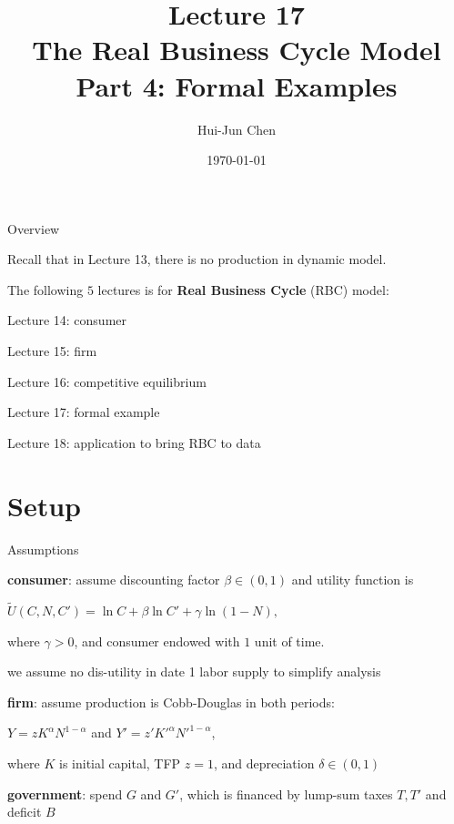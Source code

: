 \documentclass[11pt,aspectratio=169,usenames,dvipsnames]{beamer}
\title[Lecture 17]{Lecture 17 \\ The Real Business Cycle Model \\ Part 4: Formal Examples}
\author[Hui-Jun Chen]{Hui-Jun Chen}
\institute[NTHU]{National Tsing Hua University}
\date{\today}
\let\tempone\itemize
\let\temptwo\enditemize
\renewenvironment{itemize}{\tempone\addtolength{\itemsep}{\fill}}{\temptwo}
\begin{document}
\begin{frame}[plain]
    \titlepage
\end{frame}

\begin{frame}{Overview}
\label{slide:Overview}
    \begin{itemize}
        \item Recall that in Lecture 13, there is no production in dynamic model.
        \item The following $ 5 $ lectures is for \textbf{Real Business Cycle} (RBC) model:
        \begin{itemize}
            \item Lecture 14: consumer
            \item Lecture 15: firm
            \item Lecture 16: competitive equilibrium
            \item Lecture 17: formal example
            \item Lecture 18: application to bring RBC to data
        \end{itemize}
    \end{itemize}
\end{frame}

\section{Setup}
\label{sec:Setup}

\begin{frame}{Assumptions}
\label{slide:Assumptions}
    \begin{itemize}
        \item \textbf{consumer}: assume discounting factor $ \beta \in ( 0, 1 ) $ and utility function is
        \begin{center}
            $ \displaystyle \tilde{U}( C, N, C') = \ln C + \beta \ln C' + \gamma \ln ( 1-N ),$
        \end{center}
        where $ \gamma > 0 $, and consumer endowed with $ 1 $ unit of time.
        \begin{itemize}
            \item we assume no dis-utility in date 1 labor supply to simplify analysis
        \end{itemize}
        \item \textbf{firm}: assume production is Cobb-Douglas in both periods:
        \begin{center}
            $ \displaystyle Y = z K^{\alpha} N^{1-\alpha} $ and $ \displaystyle Y' = z' K'^{\alpha} N'^{1-\alpha} $,
        \end{center}
        where $ K $ is initial capital, TFP $ z = 1 $, and depreciation $ \delta \in ( 0, 1 ) $
        \item \textbf{government}: spend $ G $ and $ G' $, which is financed by lump-sum taxes $ T, T' $ and deficit $ B $
    \end{itemize}
\end{frame}
\end{document}

